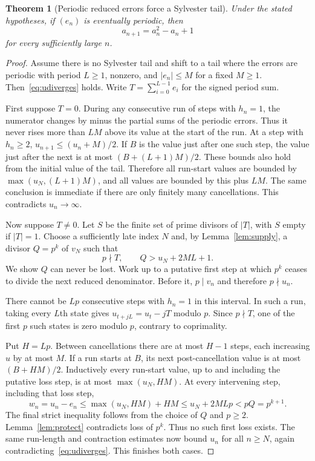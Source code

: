 \documentclass[11pt]{article}
\newtheorem{theorem}{Theorem}
\begin{document}
\begin{theorem}[Periodic reduced errors force a Sylvester tail]
Under the stated hypotheses, if $(e_n)$ is eventually periodic, then
\[
 a_{n+1}=a_n^2-a_n+1
\]
for every sufficiently large $n$.
\end{theorem}
\begin{proof}
Assume there is no Sylvester tail and shift to a tail where the errors
are periodic with period $L\ge1$, nonzero, and $|e_n|\le M$ for a
fixed $M\ge1$. Then~\eqref{eq:udiverges} holds. Write
$T=\sum_{i=0}^{L-1}e_i$ for the signed period sum.

First suppose $T=0$. During any consecutive run of steps with $h_n=1$,
the numerator changes by minus the partial sums of the periodic errors.
Thus it never rises more than $LM$ above its value at the start of the
run. At a step with $h_n\ge2$,
$u_{n+1}\le(u_n+M)/2$. If $B$ is the value just after one such
step, the value just after the next is at most
$(B+(L+1)M)/2$. These bounds also hold from the initial value of the
tail. Therefore all run-start values are bounded by
$\max(u_N,(L+1)M)$, and all values are bounded by this plus $LM$.
The same conclusion is immediate if there are only finitely many
cancellations. This contradicts $u_n\to\infty$.

Now suppose $T\ne0$. Let $S$ be the finite set of prime divisors of
$|T|$, with $S$ empty if $|T|=1$. Choose a sufficiently late index $N$
and, by Lemma~\ref{lem:supply}, a divisor $Q=p^k$ of $v_N$ such that
\[
 p\nmid T,\qquad Q>u_N+2ML+1.
\]
We show $Q$ can never be lost. Work up to a putative first step at
which $p^k$ ceases to divide the next reduced denominator. Before it,
$p\mid v_n$ and therefore $p\nmid u_n$.

There cannot be $Lp$ consecutive steps with $h_n=1$ in this interval.
In such a run, taking every $L$th state gives
$u_{t+jL}=u_t-jT$ modulo $p$. Since $p\nmid T$, one of the first
$p$ such states is zero modulo $p$, contrary to coprimality.

Put $H=Lp$. Between cancellations there are at most $H-1$ steps,
each increasing $u$ by at most $M$. If a run starts at $B$, its
next post-cancellation value is at most $(B+HM)/2$. Inductively every
run-start value, up to and including the putative loss step, is at most
$\max(u_N,HM)$. At every intervening step, including that loss step,
\[
 w_n=u_n-e_n\le\max(u_N,HM)+HM
 \le u_N+2MLp<pQ=p^{k+1}.
\]
The final strict inequality follows from the choice of $Q$ and $p\ge2$.
Lemma~\ref{lem:protect} contradicts loss of $p^k$. Thus no such
first loss exists. The same run-length and contraction estimates now
bound $u_n$ for all $n\ge N$, again contradicting~\eqref{eq:udiverges}.
This finishes both cases.
\end{proof}
\end{document}
